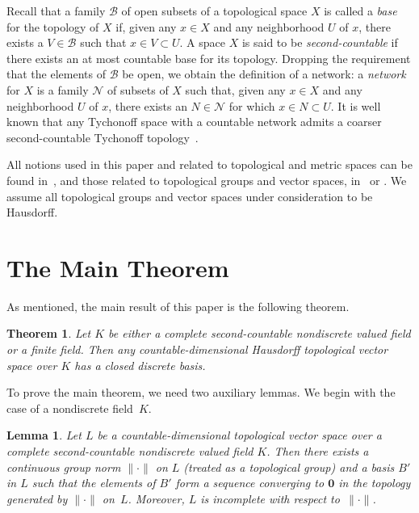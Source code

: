 \documentclass[a4paper]{amsart}
\newtheorem{theorem}{Theorem}
\newtheorem{lemma}{Lemma}
\theoremstyle{definition}
\begin{document}
Recall that a family $\mathscr B$ of open subsets of a topological space $X$ is called a \emph{base} for the 
topology of $X$ if, given any $x\in X$ and any neighborhood $U$ of $x$, there exists a $V\in \mathscr B$ such that 
$x\in V\subset U$. A space $X$ is said to be \emph{second-countable} if there exists an at most countable base for its topology. 
Dropping the requirement that the elements of $\mathscr B$ be open, we obtain the definition of a network: 
a \emph{network} for $X$ is a family $\mathscr N$ of subsets of $X$ such that, given any $x\in X$ and any neighborhood 
$U$ of $x$, there exists an $N\in \mathscr N$ for which $x\in N\subset U$. It is well known that any Tychonoff 
space with a countable network admits a coarser second-countable Tychonoff topology~\cite{Arhangelskii66}. 

All notions used in this paper and related to topological and metric spaces can be found in~\cite{Engelking}, and 
those related to topological groups and vector spaces, in~\cite{Bourbaki} or \cite{AT}. We assume all topological 
groups and vector spaces under consideration to be Hausdorff.

\section{The Main Theorem}

As mentioned, the main result of this paper is the following theorem.

\begin{theorem}
Let $K$ be either a complete second-countable nondiscrete valued field or a finite field. 
Then any countable-dimensional Hausdorff topological vector space over $K$ has a closed discrete basis. 
\end{theorem}

To prove the main theorem, we need two auxiliary lemmas. We begin with the case of a nondiscrete field~$K$. 

\begin{lemma}
\label{l1}
Let $L$ be a countable-dimensional topological vector space over a complete second-countable nondiscrete valued 
field $K$. Then there exists a continuous group norm $\lVert\boldsymbol \cdot\rVert$ on $L$ (treated as a 
topological group) and a basis $B'$ in $L$ such that the elements of $B'$ form a sequence converging to $\mathbf 0$ 
in the topology generated by $\lVert\boldsymbol \cdot\rVert$ on~$L$. Moreover, $L$ is incomplete with respect 
to~$\lVert\boldsymbol \cdot\rVert$. 
\end{lemma}
\end{document}
